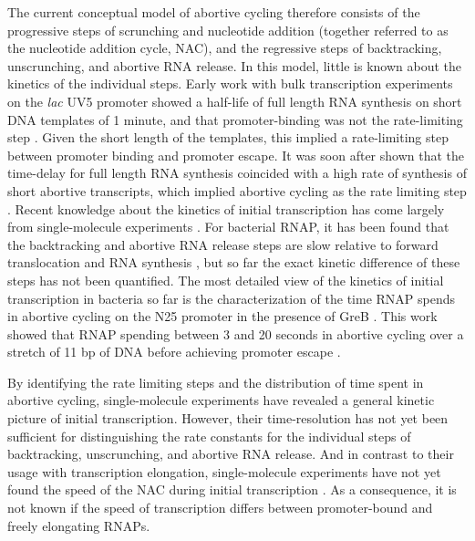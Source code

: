 The current conceptual model of abortive cycling therefore consists of the
progressive steps of scrunching and nucleotide addition (together referred to
as the nucleotide addition cycle, NAC), and the regressive steps of
backtracking, unscrunching, and abortive RNA release. In this model, little is
known about the kinetics of the individual steps. Early work with bulk
transcription experiments on the \textit{lac} UV5 promoter showed a half-life
of full length RNA synthesis on short DNA templates of 1 minute, and that
promoter-binding was not the rate-limiting step \cite{stefano_lac_1979}. Given
the short length of the templates, this implied a rate-limiting step between
promoter binding and promoter escape. It was soon after shown that the
time-delay for full length RNA synthesis coincided with a high rate of
synthesis of short abortive transcripts, which implied abortive cycling as the
rate limiting step \cite{munson_abortive_1981}. Recent knowledge about the
kinetics of initial transcription has come largely from single-molecule
experiments \cite{revyakin_abortive_2006, kapanidis_initial_2006,
tang_real-time_2009, kapanidis_retention_2005, margeat_direct_2006}. For
bacterial RNAP, it has been found that the backtracking and abortive RNA
release steps are slow relative to forward translocation and RNA synthesis
\cite{revyakin_abortive_2006, margeat_direct_2006}, but so far the exact
kinetic difference of these steps has not been quantified. The most detailed
view of the kinetics of initial transcription in bacteria so far is the
characterization of the time RNAP spends in abortive cycling on the N25
promoter in the presence of GreB \cite{revyakin_abortive_2006}. This work
showed that RNAP spending between 3 and 20 seconds in abortive cycling over a
stretch of 11 bp of DNA before achieving promoter escape
\cite{revyakin_abortive_2006}.

By identifying the rate limiting steps and the distribution of time spent in
abortive cycling, single-molecule experiments have revealed a general kinetic
picture of initial transcription. However, their time-resolution has not yet
been sufficient for distinguishing the rate constants for the individual steps
of backtracking, unscrunching, and abortive RNA release. And in contrast to
their usage with transcription elongation, single-molecule experiments have
not yet found the speed of the NAC during initial transcription
\cite{revyakin_abortive_2006, margeat_direct_2006}. As a consequence, it is
not known if the speed of transcription differs between promoter-bound and
freely elongating RNAPs.

